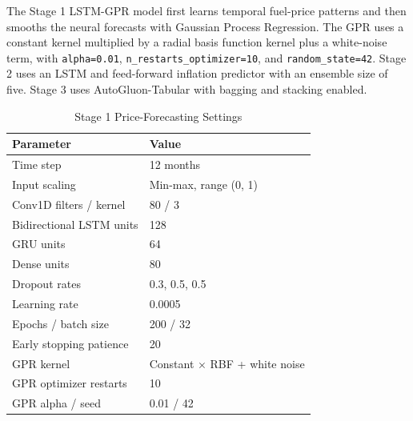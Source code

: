 The Stage 1 LSTM-GPR model first learns temporal fuel-price patterns and then smooths the neural forecasts with Gaussian Process Regression. The GPR uses a constant kernel multiplied by a radial basis function kernel plus a white-noise term, with \texttt{alpha=0.01}, \texttt{n\_restarts\_optimizer=10}, and \texttt{random\_state=42}. Stage 2 uses an LSTM and feed-forward inflation predictor with an ensemble size of five. Stage 3 uses AutoGluon-Tabular with bagging and stacking enabled.

\begin{table}[!ht]
\centering
\caption{Stage 1 Price-Forecasting Settings}
\label{tab:hyperparameter-summary}
\label{tab:appendix-stage1-settings}
\scriptsize
\begin{tabular}{P{0.48\columnwidth}P{0.36\columnwidth}}
\toprule
\textbf{Parameter} & \textbf{Value} \\
\midrule
Time step & 12 months \\
Input scaling & Min-max, range (0, 1) \\
Conv1D filters / kernel & 80 / 3 \\
Bidirectional LSTM units & 128 \\
GRU units & 64 \\
Dense units & 80 \\
Dropout rates & 0.3, 0.5, 0.5 \\
Learning rate & 0.0005 \\
Epochs / batch size & 200 / 32 \\
Early stopping patience & 20 \\
GPR kernel & Constant $\times$ RBF + white noise \\
GPR optimizer restarts & 10 \\
GPR alpha / seed & 0.01 / 42 \\
\bottomrule
\end{tabular}
\end{table}

